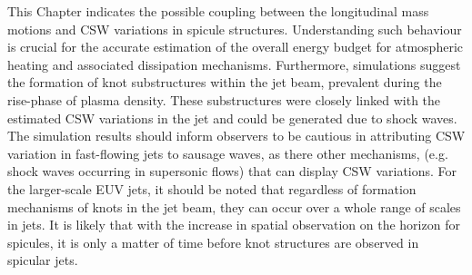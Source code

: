 %
This Chapter indicates the possible coupling between the longitudinal mass motions and CSW variations in spicule structures. Understanding such behaviour is crucial for the accurate estimation of the overall energy budget for atmospheric heating and associated dissipation mechanisms. Furthermore, simulations suggest the formation of knot substructures within the jet beam, prevalent during the rise-phase of plasma density. These substructures were closely linked with the estimated CSW variations in the jet and could be generated due to shock waves. The simulation results should inform observers to be cautious in attributing CSW variation in fast-flowing jets to sausage waves, as there other mechanisms, (e.g. shock waves occurring in supersonic flows) that can display CSW variations. \np
%
For the larger-scale EUV jets, it should be noted that regardless of formation mechanisms of knots in the jet beam, they can occur over a whole range of scales in jets. It is likely that with the increase in spatial observation on the horizon for spicules, it is only a matter of time before knot structures are observed in spicular jets.